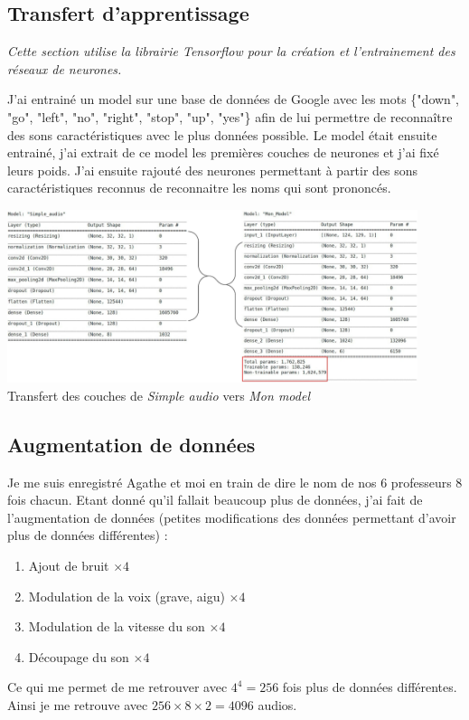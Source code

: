 \documentclass[12pt,a4paper, french]{article}
\begin{document}
\subsection{Transfert d'apprentissage}
\textit{Cette section utilise la librairie Tensorflow pour la création et l'entrainement des réseaux de neurones.}  
  
J'ai entrainé un model sur une base de données de Google avec les mots \{"down", "go", "left", "no", "right", "stop", "up", "yes"\} afin de lui permettre de reconnaître des sons caractéristiques avec le plus données possible. Le model était ensuite entrainé, j'ai extrait de ce model les premières couches de neurones et j'ai fixé leurs poids. J'ai ensuite rajouté des neurones permettant à partir des sons caractéristiques reconnus de reconnaitre les noms qui sont prononcés.
\begin{center}
    \includegraphics[width=12cm]{4-Transfert Learning.jpg} \\
    Transfert des couches de \textit{Simple audio} vers \textit{Mon model}
\end{center}

\subsection{Augmentation de données}
Je me suis enregistré Agathe et moi en train de dire le nom de nos 6 professeurs 8 fois chacun. Etant donné qu'il fallait beaucoup plus de données, j'ai fait de l'augmentation de données (petites modifications des données permettant d'avoir plus de données différentes) :  
\begin{enumerate}
	\item Ajout de bruit $\times 4$
	\item Modulation de la voix (grave, aigu) $\times 4$
	\item Modulation de la vitesse du son $\times 4$
	\item Découpage du son $\times 4$
\end{enumerate}
Ce qui me permet de me retrouver avec $4^4 = 256$ fois plus de données différentes. Ainsi je me retrouve avec $256 \times 8 \times 2 = 4096$ audios.
\end{document}
